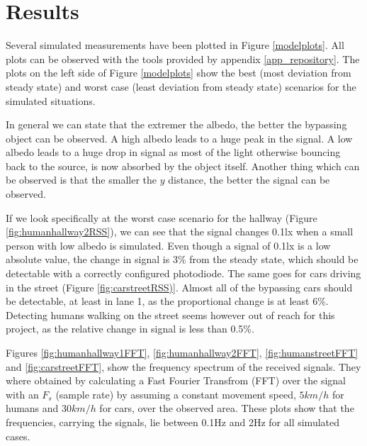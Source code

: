 \section{Results}
Several simulated measurements have been plotted in Figure \ref{modelplots}.  All plots can be observed with the tools provided by appendix \ref{app_repository}. The plots on the left side of Figure \ref{modelplots} show the best (most deviation from steady state) and worst case (least deviation from steady state) scenarios for the simulated situations. 

In general we can state that the extremer the albedo, the better the bypassing object can be observed. A high albedo leads to a huge peak in the signal. A low albedo leads to a huge drop in signal as most of the light otherwise bouncing back to the source, is now absorbed by the object itself. Another thing which can be observed is that the smaller the $y$ distance, the better the signal can be observed.

If we look specifically at the worst case scenario for the hallway (Figure \ref{fig:humanhallway2RSS}), we can see that the signal changes 0.1lx when a small person with low albedo is simulated. Even though a signal of 0.1lx is a low absolute value, the change in signal is 3\% from the steady state, which should be detectable with a correctly configured photodiode. The same goes for cars driving in the street (Figure \ref{fig:carstreetRSS)}. Almost all of the bypassing cars should be detectable, at least in lane 1, as the proportional change is at least 6\%. Detecting humans walking on the street seems however out of reach for this project, as the relative change in signal is less than 0.5\%.

Figures \ref{fig:humanhallway1FFT}, \ref{fig:humanhallway2FFT}, \ref{fig:humanstreetFFT} and \ref{fig:carstreetFFT}, show the frequency spectrum of the received signals. They where obtained by calculating a Fast Fourier Transfrom (FFT) over the signal with an $F_s$ (sample rate) by assuming a constant movement speed, $5km/h$ for humans and $30km/h$ for cars, over the observed area. These plots show that the frequencies, carrying the signals, lie between 0.1Hz and 2Hz for all simulated cases.

